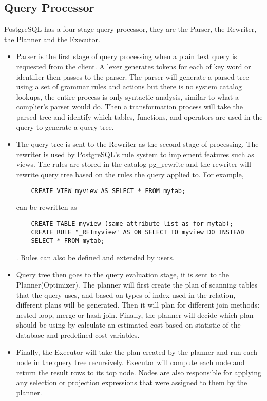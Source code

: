 \documentclass[a4paper]{article}
\begin{document}
\subsection{Query Processor}

PostgreSQL has a four-stage query processor, they are the Parser, the Rewriter, the Planner and the Executor.

\begin{itemize}
	\item Parser is the first stage of query processing when a plain text query is requested from the client. A lexer generates tokens for each of key word or identifier then passes to the parser. The parser will generate a parsed tree using a set of grammar rules and actions but there is no system catalog lookups, the entire process is only syntactic analysis, similar to what a complier's parser would do. Then a transformation process will take the parsed tree and identify which tables, functions, and operators are used in the query to generate a query tree\cite{1}.
    
    \item The query tree is sent to the Rewriter as the second stage of processing. The rewriter is used by PostgreSQL's rule system to implement features such as views. The rules are stored in the catalog pg\_rewrite and the rewriter will rewrite query tree based on the rules the query applied to. For example,
\begin{lstlisting}
 	CREATE VIEW myview AS SELECT * FROM mytab;
\end{lstlisting}
 can be rewritten as
 \begin{lstlisting}
    CREATE TABLE myview (same attribute list as for mytab);
    CREATE RULE "_RETmyview" AS ON SELECT TO myview DO INSTEAD
    SELECT * FROM mytab;
\end{lstlisting}\cite{18}.
Rules can also be defined and extended by users.

    \item Query tree then goes to the query evaluation stage, it is sent to the Planner(Optimizer). The planner will first create the plan of scanning tables that the query uses, and based on types of index used in the relation, different plans will be generated. Then it will plan for different join methods: nested loop, merge or hash join. Finally, the planner will decide which plan should be using by calculate an estimated cost based on statistic of the database and predefined cost variables\cite{1}.
    
    \item Finally, the Executor will take the plan created by the planner and run each node in the query tree recursively. Executor will compute each node and return the result rows to its top node. Nodes are also responsible for applying any selection or projection expressions that were assigned to them by the planner\cite{1}.
    
\end{itemize}
\end{document}
